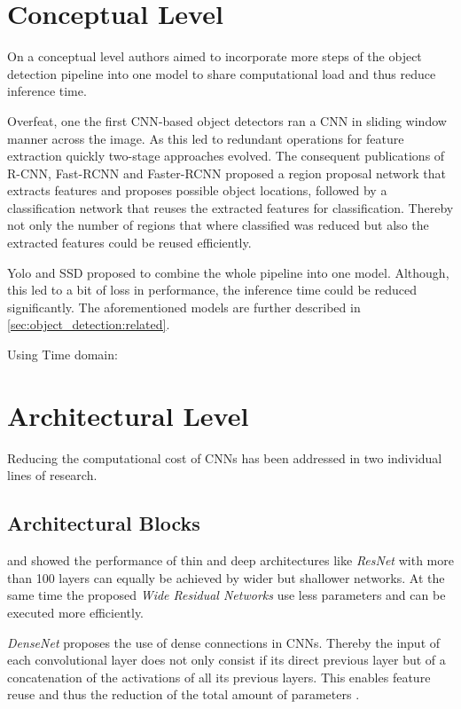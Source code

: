 \section{Conceptual Level}
 On a conceptual level authors aimed to incorporate more steps of the object detection pipeline into one model to share computational load and thus reduce inference time.
 
 Overfeat, one the first \ac{CNN}-based object detectors ran a \ac{CNN} in sliding window manner across the image. As this led to redundant operations for feature extraction quickly two-stage approaches evolved. The consequent publications of R-CNN, Fast-RCNN and Faster-RCNN proposed a region proposal network that extracts features and proposes possible object locations, followed by a classification network that reuses the extracted features for classification. Thereby not only the number of regions that where classified was reduced but also the extracted features could be reused efficiently.
 
 Yolo and SSD proposed to combine the whole pipeline into one model. Although, this led to a bit of loss in performance, the inference time could be reduced significantly. The aforementioned models are further described in \autoref{sec:object_detection:related}.
 
 Using Time domain:
 \cite{Chen2018}
 
 
\section{Architectural Level}

Reducing the computational cost of \acp{CNN} has been addressed in two individual lines of research.

\subsection{Architectural Blocks}

\cite{YoungwanLee} and \cite{Zagoruyko2016} showed the performance of thin and deep architectures like \textit{ResNet} with more than 100 layers can equally be achieved by wider but shallower networks. At the same time the proposed \textit{Wide Residual Networks} use less parameters and can be executed more efficiently.

\textit{DenseNet} \cite{Huang2016} proposes the use of dense connections in \acp{CNN}. Thereby the input of each convolutional layer does not only consist if its direct previous layer but of a concatenation of the activations of all its previous layers. This enables feature reuse  and thus the reduction of the total amount of parameters .

